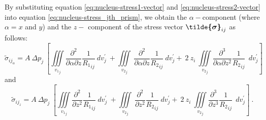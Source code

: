 \documentclass[journal abbreviation, manuscript]{copernicus}
\begin{document}
By substituting equation \ref{eq:nucleus-stress1-vector} and 
\ref{eq:nucleus-stress2-vector} into equation \ref{eq:nucleus-stress_jth_prism}, 
we obtain the $\alpha-$component (where  $\alpha = x$ and $y$) and the $z-$ component 
of the stress vector $\mbox{\boldmath$\tilde{\sigma}$}_{ij}$ as follows:
\begin{equation}
{\tilde{\sigma}}_{{ij}_\alpha} = A \: \Delta p_{j} \: \left[
\iiint\limits_{{v_{1}}_{j}}
\frac{\partial^{2}}{\partial \alpha \partial z} {\frac{1}{{R_1}_{ij}}} \: dv_{j}^{\prime}
\: + \iiint\limits_{{v_{2}}_{j}}
\: \frac{\partial^{2} }{\partial \alpha \partial z} {\frac{1}{{R_2}_{ij}}} \: 
dv_{j}^{\prime}
+ \: 2 \: z_{i} \: \iiint\limits_{{v_{2}}_{j}}
\frac{\partial^{3}  }{\partial \alpha \partial z ^{2}} {\frac{1}{{R_2}_{ij}}}  \:\: 
dv_{j}^{\prime} \right]
\label{eq:stress_til_alpha}
\end{equation}
and 
\begin{equation}
{\tilde{\sigma}}_{{ij}_{z}} = A \: \Delta p_{j} \: \left[
\iiint\limits_{{v_{1}}_{j}}
\frac{\partial^{2}}{\partial z^{2}} {\frac{1}{{R_1}_{ij}}} \: dv_{j}^{\prime}
\: + \iiint\limits_{{v_{2}}_{j}}
\: \frac{\partial^{2} }{\partial z^{2}} {\frac{1}{{R_2}_{ij}}} \: 
dv_{j}^{\prime}
+ \: 2 \: z_{i} \: \iiint\limits_{{v_{2}}_{j}}
\frac{\partial^{3}  }{\partial z^{3}} {\frac{1}{{R_2}_{ij}}}  \:\: 
dv_{j}^{\prime} \right] \: .
\label{eq:stress_til_z}
\end{equation}
\end{document}
